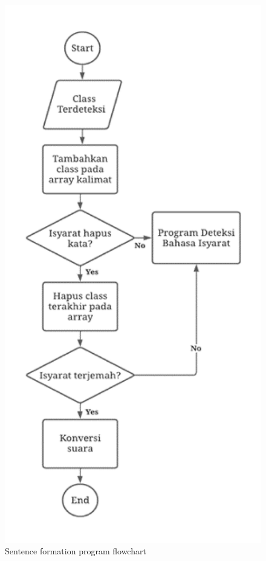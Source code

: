 \begin{figure}[H]
  \centering
  \includegraphics[scale=0.37]{gambar/bab3-flowchart-kalimat.png}
  \caption{Sentence formation program flowchart}
  \label{fig:flowchartkalimat}
\end{figure}


